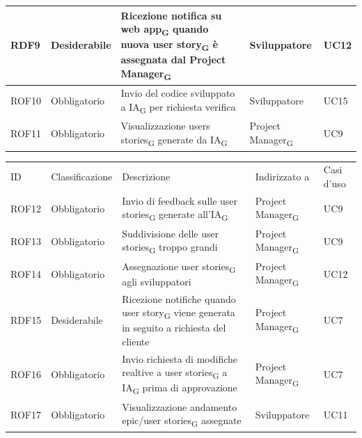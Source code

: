 \documentclass{article}
\begin{document}
\begin{center}
\begin{tabular}{|p{2cm}|p{3cm}|p{6cm}|p{3cm}|p{2cm}|}
RDF9&Desiderabile & Ricezione notifica su web app\textsubscript{G} quando nuova user story\textsubscript{G} è assegnata dal Project Manager\textsubscript{G}& Sviluppatore & UC12\\
\hline
\rowcolor{LighterBlue}
ROF10&Obbligatorio & Invio del codice sviluppato a IA\textsubscript{G} per richiesta verifica& Sviluppatore & UC15\\

\hline
\rowcolor{LightBlue}

ROF11&Obbligatorio & Visualizzazione users stories\textsubscript{G} generate da IA\textsubscript{G}  & Project Manager\textsubscript{G} & UC9\\
\hline


\end{tabular}

    \begin{tabular}{|p{2cm}|p{3cm}|p{6cm}|p{3cm}|p{2cm}|}
    \rowcolor{Blue} 
\hline
ID & Classificazione & Descrizione & Indirizzato a&Casi d'uso  \\ 
\rowcolor{LightBlue}
\hline
ROF12&Obbligatorio & Invio di feedback sulle user stories\textsubscript{G} generate all'IA\textsubscript{G}& Project Manager\textsubscript{G}&UC9\\
\hline
\rowcolor{LighterBlue}

ROF13&Obbligatorio & Suddivisione delle user stories\textsubscript{G} troppo grandi  & Project Manager\textsubscript{G}& UC9\\
\hline
\rowcolor{LightBlue}

ROF14&Obbligatorio & Assegnazione user stories\textsubscript{G} agli sviluppatori& Project Manager\textsubscript{G}& UC12\\
\hline
\rowcolor{LighterBlue}

RDF15&Desiderabile & Ricezione notifiche quando user story\textsubscript{G} viene generata in seguito a richiesta del cliente & Project Manager\textsubscript{G} & UC7\\
\hline
\rowcolor{LightBlue}

ROF16&Obbligatorio & Invio richiesta di modifiche realtive a user stories\textsubscript{G} a IA\textsubscript{G} prima di approvazione& Project Manager\textsubscript{G}& UC7\\
\hline
\rowcolor{LighterBlue}

ROF17&Obbligatorio & Visualizzazione andamento epic/user stories\textsubscript{G} assegnate& Sviluppatore& UC11\\


\end{tabular}
\end{center}
\end{document}
